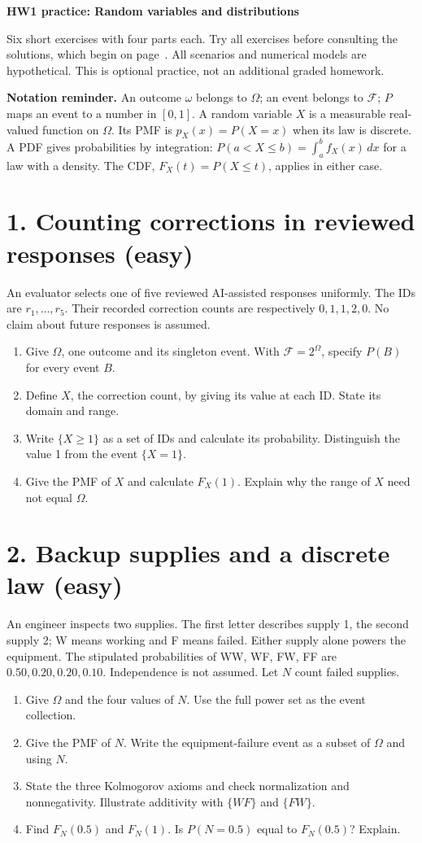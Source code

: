 \documentclass[11pt,a4paper]{article}
\begin{document}
{\Large\bfseries HW1 practice: Random variables and distributions}\par
Six short exercises with four parts each. Try all exercises before consulting the solutions, which begin on page~\pageref{solutions}. All scenarios and numerical models are hypothetical. This is optional practice, not an additional graded homework.

\textbf{Notation reminder.} An outcome $\omega$ belongs to $\Omega$; an event belongs to $\mathcal F$; $P$ maps an event to a number in $[0,1]$. A random variable $X$ is a measurable real-valued function on $\Omega$. Its PMF is $p_X(x)=P(X=x)$ when its law is discrete. A PDF gives probabilities by integration: $P(a<X\le b)=\int_a^b f_X(x)\,dx$ for a law with a density. The CDF, $F_X(t)=P(X\le t)$, applies in either case.

\section*{1. Counting corrections in reviewed responses (easy)}
An evaluator selects one of five reviewed AI-assisted responses uniformly. The IDs are $r_1,\ldots,r_5$. Their recorded correction counts are respectively $0,1,1,2,0$. No claim about future responses is assumed.
\begin{enumerate}
\item Give $\Omega$, one outcome and its singleton event. With $\mathcal F=2^\Omega$, specify $P(B)$ for every event $B$.
\item Define $X$, the correction count, by giving its value at each ID. State its domain and range.
\item Write $\{X\ge1\}$ as a set of IDs and calculate its probability. Distinguish the value 1 from the event $\{X=1\}$.
\item Give the PMF of $X$ and calculate $F_X(1)$. Explain why the range of $X$ need not equal $\Omega$.
\end{enumerate}

\section*{2. Backup supplies and a discrete law (easy)}
An engineer inspects two supplies. The first letter describes supply 1, the second supply 2; W means working and F means failed. Either supply alone powers the equipment. The stipulated probabilities of WW, WF, FW, FF are $0.50,0.20,0.20,0.10$. Independence is not assumed. Let $N$ count failed supplies.
\begin{enumerate}
\item Give $\Omega$ and the four values of $N$. Use the full power set as the event collection.
\item Give the PMF of $N$. Write the equipment-failure event as a subset of $\Omega$ and using $N$.
\item State the three Kolmogorov axioms and check normalization and nonnegativity. Illustrate additivity with $\{WF\}$ and $\{FW\}$.
\item Find $F_N(0.5)$ and $F_N(1)$. Is $P(N=0.5)$ equal to $F_N(0.5)$? Explain.
\end{enumerate}
\end{document}
